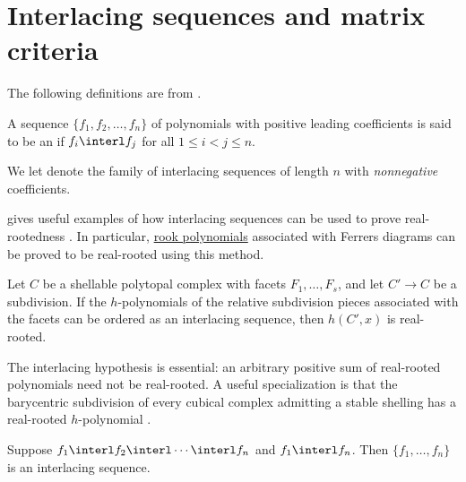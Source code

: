 


\section[interlacingSequences]{Interlacing sequences and matrix criteria}


The following definitions are from \cite{Branden2015}.

\begin{definition}
A sequence $\{f_1,f_2,\dotsc,f_n\}$ of polynomials with positive leading coefficients
is said to be an
\label{interlacingSequenceDefinition}
if $f_i \interl f_j$  for all $1\leq i \lt j \leq n$.

We let \label{positiveInterlacingFamily}
denote the family of interlacing
sequences of length $n$ with \emph{nonnegative} coefficients.
\end{definition}

 gives useful examples of how interlacing sequences can
be used to prove real-rootedness \cite{Branden2015}.
In particular, \hyperref[realRootedMatching]{rook polynomials} associated with
Ferrers diagrams can be proved to be real-rooted using this method.


\begin{theorem}
\label{shellingInterlacingCriterion}
Let $C$ be a shellable polytopal complex with facets $F_1,\dotsc,F_s$, and
let $C'\to C$ be a subdivision.  If the $h$-polynomials of the relative
subdivision pieces associated with the facets can be ordered as an
interlacing sequence, then $h(C',x)$ is real-rooted.
\end{theorem}
The interlacing hypothesis is essential: an arbitrary positive sum of
real-rooted polynomials need not be real-rooted.  A useful specialization is
that the barycentric subdivision of every cubical complex admitting a stable
shelling has a real-rooted $h$-polynomial
\cite[Thm.~4.7]{HlavacekSolus2022}.


\begin{proposition}
Suppose $f_1 \interl f_2 \interl \dotsb \interl f_n$ and $f_1 \interl f_n$.
Then $\{f_1,\dotsc,f_n\}$ is an interlacing sequence.
\end{proposition}


